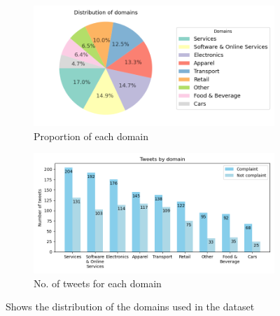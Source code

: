 \begin{figure}[htbp]
    \centering
    \captionsetup{font=small}
    \begin{subfigure}{0.49\textwidth}
        \centering
        \includegraphics[width=\linewidth]{figures/domain_dist.png}
        \caption{Proportion of each domain}
        \label{fig: domain_dist_pct}
    \end{subfigure}
    \hfill
    \begin{subfigure}{0.49\textwidth}
        \centering
        \includegraphics[width=\linewidth]{figures/domain_counts_bar_norandom.png}
        \caption{No. of tweets for each domain}
        \label{fig: domain_dist_count}
    \end{subfigure}
    \caption{Shows the distribution of the domains used in the dataset}
    \label{fig: compl_main_dist}
\end{figure}


